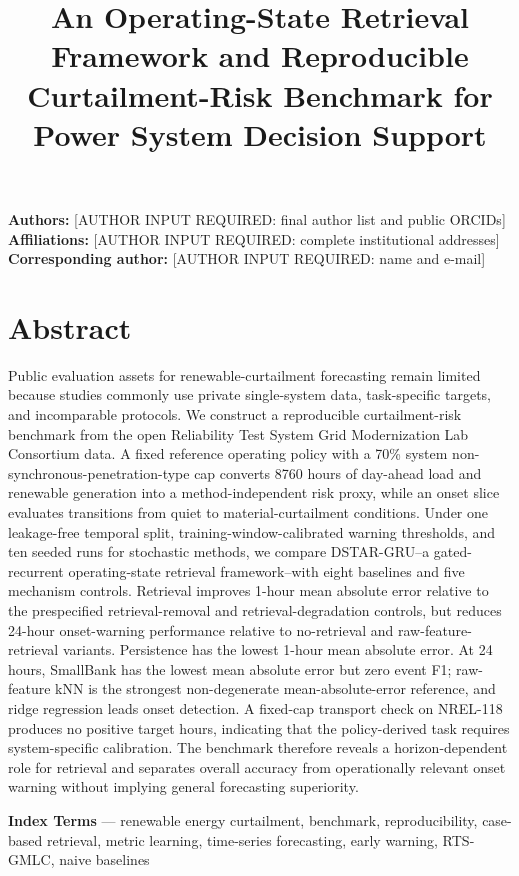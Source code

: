 \documentclass[
  10pt,
  a4paper,
]{article}
\title{An Operating-State Retrieval Framework and Reproducible
Curtailment-Risk Benchmark for Power System Decision Support}
\author{}
\date{}
\begin{document}
\maketitle

{
\hypersetup{linkcolor=}
\setcounter{tocdepth}{3}
\tableofcontents
}
\textbf{Authors:} {[}AUTHOR INPUT REQUIRED: final author list and public
ORCIDs{]} \textbf{Affiliations:} {[}AUTHOR INPUT REQUIRED: complete
institutional addresses{]} \textbf{Corresponding author:} {[}AUTHOR
INPUT REQUIRED: name and e-mail{]}

\section{Abstract}\label{abstract}

Public evaluation assets for renewable-curtailment forecasting remain
limited because studies commonly use private single-system data,
task-specific targets, and incomparable protocols. We construct a
reproducible curtailment-risk benchmark from the open Reliability Test
System Grid Modernization Lab Consortium data. A fixed reference
operating policy with a 70\% system non-synchronous-penetration-type cap
converts 8760 hours of day-ahead load and renewable generation into a
method-independent risk proxy, while an onset slice evaluates
transitions from quiet to material-curtailment conditions. Under one
leakage-free temporal split, training-window-calibrated warning
thresholds, and ten seeded runs for stochastic methods, we compare
DSTAR-GRU--a gated-recurrent operating-state retrieval framework--with
eight baselines and five mechanism controls. Retrieval improves 1-hour
mean absolute error relative to the prespecified retrieval-removal and
retrieval-degradation controls, but reduces 24-hour onset-warning
performance relative to no-retrieval and raw-feature-retrieval variants.
Persistence has the lowest 1-hour mean absolute error. At 24 hours,
SmallBank has the lowest mean absolute error but zero event F1;
raw-feature kNN is the strongest non-degenerate mean-absolute-error
reference, and ridge regression leads onset detection. A
fixed-cap transport check on NREL-118 produces no positive target hours,
indicating that the policy-derived task requires system-specific
calibration. The benchmark therefore reveals a horizon-dependent role
for retrieval and separates overall accuracy from operationally relevant
onset warning without implying general forecasting superiority.

\textbf{Index Terms} --- renewable energy curtailment, benchmark,
reproducibility, case-based retrieval, metric learning, time-series
forecasting, early warning, RTS-GMLC, naive baselines
\end{document}
